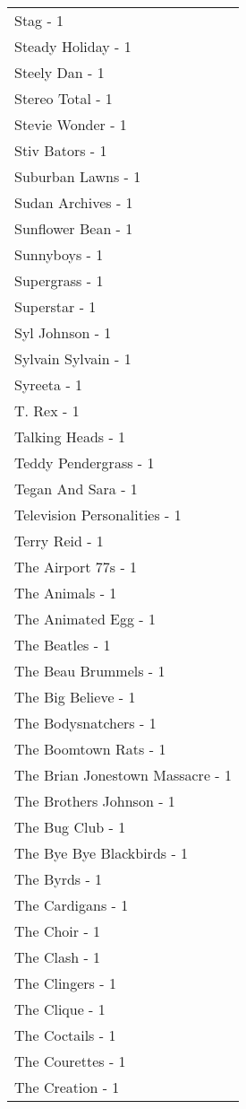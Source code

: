 \documentclass[
]{article}
\begin{document}
\begin{longtable}{l}
Stag - 1 \\ 
Steady Holiday - 1 \\ 
Steely Dan - 1 \\ 
Stereo Total - 1 \\ 
Stevie Wonder - 1 \\ 
Stiv Bators - 1 \\ 
Suburban Lawns - 1 \\ 
Sudan Archives - 1 \\ 
Sunflower Bean - 1 \\ 
Sunnyboys - 1 \\ 
Supergrass - 1 \\ 
Superstar - 1 \\ 
Syl Johnson - 1 \\ 
Sylvain Sylvain - 1 \\ 
Syreeta - 1 \\ 
T. Rex - 1 \\ 
Talking Heads - 1 \\ 
Teddy Pendergrass - 1 \\ 
Tegan And Sara - 1 \\ 
Television Personalities - 1 \\ 
Terry Reid - 1 \\ 
The Airport 77s - 1 \\ 
The Animals - 1 \\ 
The Animated Egg - 1 \\ 
The Beatles - 1 \\ 
The Beau Brummels - 1 \\ 
The Big Believe - 1 \\ 
The Bodysnatchers - 1 \\ 
The Boomtown Rats - 1 \\ 
The Brian Jonestown Massacre - 1 \\ 
The Brothers Johnson - 1 \\ 
The Bug Club - 1 \\ 
The Bye Bye Blackbirds - 1 \\ 
The Byrds - 1 \\ 
The Cardigans - 1 \\ 
The Choir - 1 \\ 
The Clash - 1 \\ 
The Clingers - 1 \\ 
The Clique - 1 \\ 
The Coctails - 1 \\ 
The Courettes - 1 \\ 
The Creation - 1 \\ 

\end{longtable}
\end{document}
